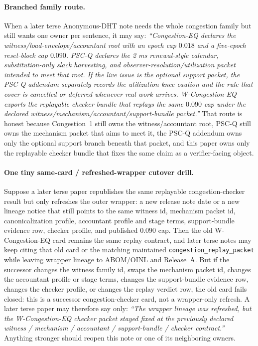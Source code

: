 \documentclass[11pt]{article}
\begin{document}
\paragraph{Branched family route.}
When a later terse Anonymous-DHT note needs the whole congestion family but still wants one owner per sentence, it may say: \emph{``Congestion-EQ declares the witness/load-envelope/accountant root with an epoch cap $0.018$ and a five-epoch reset-block cap $0.090$. PSC-Q declares the 2 ms renewal-style calendar, substitution-only slack harvesting, and observer-resolution/utilization packet intended to meet that root. If the live issue is the optional support packet, the PSC-Q addendum separately records the utilization-knee caution and the rule that cover is cancelled or deferred whenever real work arrives. W-Congestion-EQ exports the replayable checker bundle that replays the same $0.090$ cap under the declared witness/mechanism/accountant/support-bundle packet.''}
That route is honest because Congestion~1 still owns the witness/accountant root, PSC-Q still owns the mechanism packet that aims to meet it, the PSC-Q addendum owns only the optional support branch beneath that packet, and this paper owns only the replayable checker bundle that fixes the same claim as a verifier-facing object.\cite{series:congeq,series:pscq,series:pscqaddendum}

\paragraph{One tiny same-card / refreshed-wrapper cutover drill.}
Suppose a later terse paper republishes the same replayable congestion-checker result but only refreshes the outer wrapper: a new release note date or a new lineage notice that still points to the same witness id, mechanism packet id, canonicalization profile, accountant profile and stage terms, support-bundle evidence row, checker profile, and published $0.090$ cap. Then the old W-Congestion-EQ card remains the same replay contract, and later terse notes may keep citing that old card or the matching maintained \nolinkurl{congestion\_replay\_packet} while leaving wrapper lineage to ABOM/OINL and Release~A.
But if the successor changes the witness family id, swaps the mechanism packet id, changes the accountant profile or stage terms, changes the support-bundle evidence row, changes the checker profile, or changes the replay verdict row, the old card fails closed: this is a successor congestion-checker card, not a wrapper-only refresh.
A later terse paper may therefore say only: \emph{``The wrapper lineage was refreshed, but the W-Congestion-EQ checker packet stayed fixed at the previously declared witness / mechanism / accountant / support-bundle / checker contract.''} Anything stronger should reopen this note or one of its neighboring owners.
\end{document}
